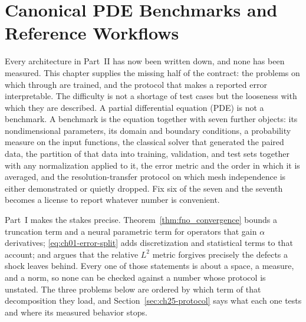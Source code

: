 
\chapter{Canonical PDE Benchmarks and Reference Workflows}
\label{ch:part2-canonical-pde-benchmarks-and-reference-wor}
\label{sec:benchmarks}

Every architecture in Part~II has now been written down, and none has been
measured. This chapter supplies the missing half of the contract: the problems on
which  through
 are trained, and
the protocol that makes a reported error interpretable. The difficulty is not a
shortage of test cases but the looseness with which they are described. A partial
differential equation (PDE) is not a benchmark. A benchmark is the equation
together with seven further objects: its nondimensional parameters, its domain
and boundary conditions, a probability measure on the input functions, the
classical solver that generated the paired data, the partition of that data into
training, validation, and test sets together with any normalization applied to
it, the error metric and the order in which it is averaged, and the
resolution-transfer protocol on which mesh independence is either demonstrated or
quietly dropped. Fix six of the seven and the seventh becomes a license to report
whatever number is convenient.

Part~I makes the stakes precise.
Theorem~\ref{thm:fno_convergence} bounds a truncation term and a neural
parametric term for operators that gain $\alpha$ derivatives;
\eqref{eq:ch01-error-split} adds discretization and statistical terms to that
account; and  argues
that the relative $L^{2}$ metric forgives precisely the defects a shock leaves
behind. Every one of those statements is about a space, a measure, and a norm, so
none can be checked against a number whose protocol is unstated. The three
problems below are ordered by which term of that decomposition they load, and
Section~\ref{sec:ch25-protocol} says what each one tests and where its measured
behavior stops.

